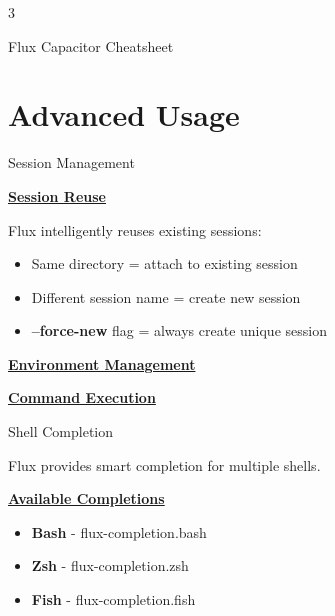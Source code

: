 \documentclass[10pt,a4paper]{article}
\begin{document}
\begin{multicols}{3}
\raggedright

\centering

\huge \color{fluxblue}Flux {\color{blues}Capacitor} \color{white} Cheatsheet \scriptsize 

\raggedright
\vspace{5mm}

\section{Advanced Usage}

\begin{textbox}{Session Management}

\underline{\textbf{Session Reuse}}

Flux intelligently reuses existing sessions:
\begin{itemize}
    \item Same directory = attach to existing session
    \item Different session name = create new session
    \item \textbf{--force-new} flag = always create unique session
\end{itemize}

\underline{\textbf{Environment Management}}




\underline{\textbf{Command Execution}}




\end{textbox}

\begin{textbox}{Shell Completion}

Flux provides smart completion for multiple shells.

\underline{\textbf{Available Completions}}
\begin{itemize}
    \item \textbf{Bash} - flux-completion.bash
    \item \textbf{Zsh} - flux-completion.zsh  
    \item \textbf{Fish} - flux-completion.fish
\end{itemize}


\end{textbox}
\end{multicols}
\end{document}
